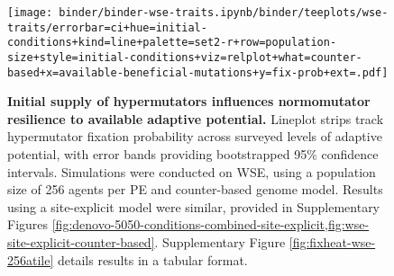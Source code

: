 \begin{figure}[h]
\begin{minipage}{0.6\textwidth}
  \texttt{[image: binder/binder-wse-traits.ipynb/binder/teeplots/wse-traits/errorbar=ci+hue=initial-conditions+kind=line+palette=set2-r+row=population-size+style=initial-conditions+viz=relplot+what=counter-based+x=available-beneficial-mutations+y=fix-prob+ext=.pdf]}%
\end{minipage}%
\begin{minipage}{0.4\textwidth}
  \caption{
  \textbf{Initial supply of hypermutators influences normomutator resilience to available adaptive potential.}
  \footnotesize
  Lineplot strips track hypermutator fixation probability across surveyed levels of adaptive potential, with error bands providing bootstrapped 95\% confidence intervals.
  Simulations were conducted on WSE, using a population size of 256 agents per PE and counter-based genome model.
  Results using a site-explicit model were similar, provided in Supplementary Figures \cref{fig:denovo-5050-conditions-combined-site-explicit,fig:wse-site-explicit-counter-based}.
  Supplementary Figure \ref{fig:fixheat-wse-256atile} details results in a tabular format.
    }
    \label{fig:denovo-5050-conditions-combined}
  \end{minipage}
\end{figure}
